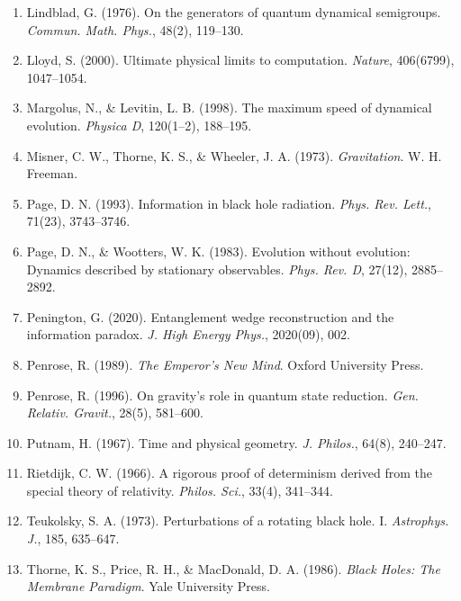 \documentclass[11pt,a4paper]{article}
\begin{document}
\begin{enumerate}[label=\textbf{\arabic*.}, leftmargin=*, itemsep=0.3em]
    \item Lindblad, G. (1976). On the generators of quantum dynamical semigroups. \emph{Commun. Math. Phys.}, 48(2), 119--130.
    \item Lloyd, S. (2000). Ultimate physical limits to computation. \emph{Nature}, 406(6799), 1047--1054.
    \item Margolus, N., \& Levitin, L. B. (1998). The maximum speed of dynamical evolution. \emph{Physica D}, 120(1--2), 188--195.
    \item Misner, C. W., Thorne, K. S., \& Wheeler, J. A. (1973). \emph{Gravitation}. W. H. Freeman.
    \item Page, D. N. (1993). Information in black hole radiation. \emph{Phys. Rev. Lett.}, 71(23), 3743--3746.
    \item Page, D. N., \& Wootters, W. K. (1983). Evolution without evolution: Dynamics described by stationary observables. \emph{Phys. Rev. D}, 27(12), 2885--2892.
    \item Penington, G. (2020). Entanglement wedge reconstruction and the information paradox. \emph{J. High Energy Phys.}, 2020(09), 002.
    \item Penrose, R. (1989). \emph{The Emperor's New Mind}. Oxford University Press.
    \item Penrose, R. (1996). On gravity's role in quantum state reduction. \emph{Gen. Relativ. Gravit.}, 28(5), 581--600.
    \item Putnam, H. (1967). Time and physical geometry. \emph{J. Philos.}, 64(8), 240--247.
    \item Rietdijk, C. W. (1966). A rigorous proof of determinism derived from the special theory of relativity. \emph{Philos. Sci.}, 33(4), 341--344.
    \item Teukolsky, S. A. (1973). Perturbations of a rotating black hole. I. \emph{Astrophys. J.}, 185, 635--647.
    \item Thorne, K. S., Price, R. H., \& MacDonald, D. A. (1986). \emph{Black Holes: The Membrane Paradigm}. Yale University Press.
\end{enumerate}
\end{document}
